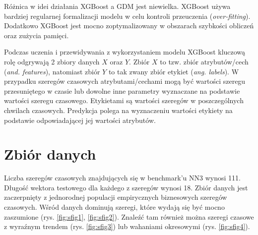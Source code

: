\documentclass[11pt]{report}
\begin{document}
Różnica w idei działania XGBoost a GDM jest niewielka.
XGBoost używa bardziej regularnej formalizacji modelu w celu kontroli przeuczenia (\textit{over-fitting}).
Dodatkowo XGBoost jest mocno zoptymalizowany w obszarach szybkości obliczeń oraz zużycia pamięci.

Podczas uczenia i przewidywania z wykorzystaniem modelu XGBoost kluczową rolę odgrywają 2 zbiory danych $X$ oraz $Y$.
Zbiór $X$ to tzw. zbiór atrybutów/cech (\textit{and. features}), natomiast zbiór $Y$ to tak zwany zbiór etykiet (\textit{ang. labels}).
W przypadku szeregów czasowych atrybutami/cechami mogą być wartości szeregu przesuniętego w czasie lub dowolne inne parametry wyznaczane na podstawie wartości szeregu czasowego.
Etykietami są wartości szeregów w poszczególnych chwilach czasowych.
Predykcja polega na wyznaczeniu wartości etykiety na podstawie odpowiadającej jej wartości atrybutów.

\section{Zbiór danych}
Liczba szeregów czasowych znajdujących się w benchmark'u NN3 wynosi 111.
Długość wektora testowego dla każdego z szeregów wynosi 18.
Zbiór danych jest zaczerpnięty z jednorodnej populacji empirycznych biznesowych szeregów czasowych.
Wśród danych dominują szeregi, które wydają się być mocno zaszumione (rys. \ref{fig:sfig1}, \ref{fig:sfig2}).
Znaleźć tam również można szeregi czasowe z wyraźnym trendem (rys. \ref{fig:sfig3}) lub wahaniami okresowymi (rys. \ref{fig:sfig4}).
\end{document}
